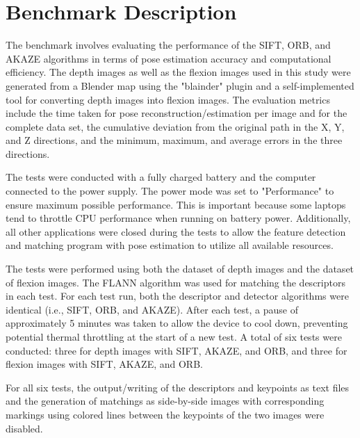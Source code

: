 \documentclass[conference, a4paper]{IEEEtran}
\begin{document}
\section{Benchmark Description}
The benchmark involves evaluating the performance of the SIFT, ORB, and AKAZE algorithms in terms of pose estimation accuracy and computational efficiency. The depth images as well as the flexion images used in this study were generated from a Blender map using the "blainder" plugin and a self-implemented tool for converting depth images into flexion images. The evaluation metrics include the time taken for pose reconstruction/estimation per image and for the complete data set, the cumulative deviation from the original path in the X, Y, and Z directions, and the minimum, maximum, and average errors in the three directions.

The tests were conducted with a fully charged battery and the computer connected to the power supply. The power mode was set to "Performance" to ensure maximum possible performance. This is important because some laptops tend to throttle CPU performance when running on battery power. Additionally, all other applications were closed during the tests to allow the feature detection and matching program with pose estimation to utilize all available resources.

The tests were performed using both the dataset of depth images and the dataset of flexion images. The FLANN algorithm was used for matching the descriptors in each test. For each test run, both the descriptor and detector algorithms were identical (i.e., SIFT, ORB, and AKAZE). After each test, a pause of approximately 5 minutes was taken to allow the device to cool down, preventing potential thermal throttling at the start of a new test. A total of six tests were conducted: three for depth images with SIFT, AKAZE, and ORB, and three for flexion images with SIFT, AKAZE, and ORB.

For all six tests, the output/writing of the descriptors and keypoints as text files and the generation of matchings as side-by-side images with corresponding markings using colored lines between the keypoints of the two images were disabled.
\end{document}
